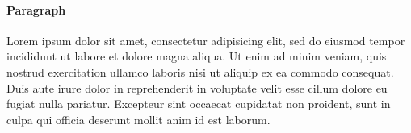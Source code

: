 \documentclass[red, ngerman]{skript}
\begin{document}
\paragraph{Paragraph}
Lorem ipsum dolor sit amet, consectetur adipisicing elit, sed do eiusmod
tempor incididunt ut labore et dolore magna aliqua. Ut enim ad minim veniam,
quis nostrud exercitation ullamco laboris nisi ut aliquip ex ea commodo
consequat. Duis aute irure dolor in reprehenderit in voluptate velit esse
cillum dolore eu fugiat nulla pariatur. Excepteur sint occaecat cupidatat non
proident, sunt in culpa qui officia deserunt mollit anim id est laborum.
\end{document}
